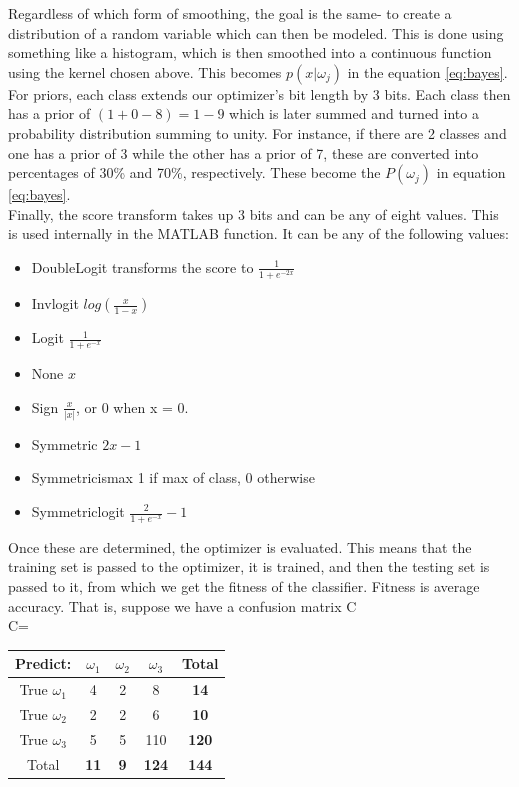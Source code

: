 Regardless of which form of smoothing, the goal is the same- to create a
distribution of a random variable which can then be modeled.  This is done using
something like a histogram, which is then smoothed into a continuous function
using the kernel chosen above.  This becomes $p(x|\omega_j)$ in the equation
\ref{eq:bayes}.\\
For priors, each class extends our optimizer's bit length by 3 bits.  Each class
then has a prior of $(1 + 0-8)= 1-9$ which is later summed and turned into a
probability distribution summing to unity.  For instance, if there are 2 classes
and one has a prior of 3 while the other has a prior of 7, these are converted
into percentages of 30\% and 70\%, respectively.  These become the $P(\omega_j)$
in equation \ref{eq:bayes}.\\
Finally, the score transform takes up 3 bits and can be any of eight values. 
This is used internally in the MATLAB function.  It can be any of the following
values:
\begin{itemize}
	\item DoubleLogit transforms the score to $\frac{1}{1+e^{-2x}}$
	\item Invlogit $log(\frac{x}{1-x})$
	\item Logit $\frac{1}{1+e^{-x}}$
	\item None $x$
	\item Sign $\frac{x}{|x|}$, or 0 when x = 0.
	\item Symmetric $2x-1$
	\item Symmetricismax 1 if max of class, 0 otherwise
	\item Symmetriclogit $\frac{2}{1+e^{-x}}-1$
\end{itemize}
Once these are determined, the optimizer is evaluated.  This means that the training set is passed to the optimizer, it is trained, and then the testing set is passed to it, from which we get the fitness of the classifier.  Fitness is average accuracy.  That is, suppose we have a confusion matrix C\\
C= \begin{tabular}{|c|c|c|c|c|}
	\hline
	Predict:&$\omega_1$&$\omega_2$&$\omega_3$&\textbf{Total}\\
	\hline
	True $\omega_1$&4&2&8&\textbf{14}\\
	\hline
	True $\omega_2$&2&2&6&\textbf{10}\\
	\hline
	True $\omega_3$&5&5&110&\textbf{120}\\
	\hline
	Total&\textbf{11}&\textbf{9}&\textbf{124}&\textbf{144}\\
	\hline
\end{tabular} 
